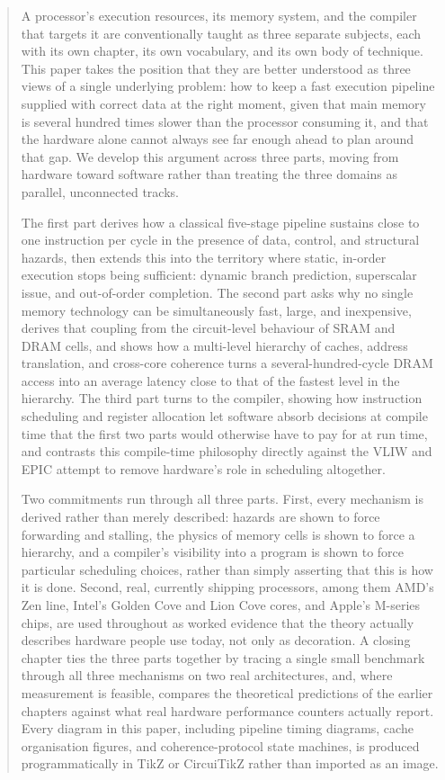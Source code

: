 \documentclass[12pt,a4paper]{report}
\begin{document}
\begin{abstract}
\noindent
A processor's execution resources, its memory system, and the compiler
that targets it are conventionally taught as three separate subjects,
each with its own chapter, its own vocabulary, and its own body of
technique. This paper takes the position that they are better understood
as three views of a single underlying problem: how to keep a fast
execution pipeline supplied with correct data at the right moment, given
that main memory is several hundred times slower than the processor
consuming it, and that the hardware alone cannot always see far enough
ahead to plan around that gap. We develop this argument across three
parts, moving from hardware toward software rather than treating the
three domains as parallel, unconnected tracks.

The first part derives how a classical five-stage pipeline sustains
close to one instruction per cycle in the presence of data, control, and
structural hazards, then extends this into the territory where static,
in-order execution stops being sufficient: dynamic branch prediction,
superscalar issue, and out-of-order completion. The second part asks why
no single memory technology can be simultaneously fast, large, and
inexpensive, derives that coupling from the circuit-level behaviour of
SRAM and DRAM cells, and shows how a multi-level hierarchy of caches,
address translation, and cross-core coherence turns a several-hundred-cycle
DRAM access into an average latency close to that of the fastest level
in the hierarchy. The third part turns to the compiler, showing how
instruction scheduling and register allocation let software absorb
decisions at compile time that the first two parts would otherwise have
to pay for at run time, and contrasts this compile-time philosophy
directly against the VLIW and EPIC attempt to remove hardware's role in
scheduling altogether.

Two commitments run through all three parts. First, every mechanism is
derived rather than merely described: hazards are shown to force
forwarding and stalling, the physics of memory cells is shown to force
a hierarchy, and a compiler's visibility into a program is shown to
force particular scheduling choices, rather than simply asserting that
this is how it is done. Second, real, currently shipping processors,
among them AMD's Zen line, Intel's Golden Cove and Lion Cove cores, and
Apple's M-series chips, are used throughout as worked evidence that the
theory actually describes hardware people use today, not only as
decoration. A closing chapter ties the three parts together by tracing a
single small benchmark through all three mechanisms on two real
architectures, and, where measurement is feasible, compares the
theoretical predictions of the earlier chapters against what real
hardware performance counters actually report. Every diagram in this
paper, including pipeline timing diagrams, cache organisation figures,
and coherence-protocol state machines, is produced programmatically in
TikZ or CircuiTikZ rather than imported as an image.


\end{abstract}
\end{document}
